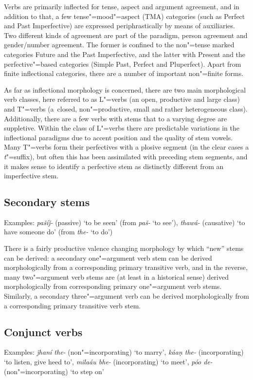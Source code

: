 Verbs are primarily inflected for tense, aspect and argument agreement, and in addition to that, a few tense"=mood"=aspect (TMA) categories (such as Perfect and Past Imperfective) are expressed periphrastically by means of auxiliaries. Two different kinds of agreement are part of the paradigm, person agreement and gender/number agreement. The former is confined to the non"=tense marked categories Future and the Past Imperfective, and the latter with Present and the perfective"=based categories (Simple Past, Perfect and Pluperfect). Apart from finite inflectional categories, there are a number of important non"=finite forms.


As far as inflectional morphology is concerned, there are two main morphological verb classes, here referred to as L"=verbs (an open, productive and large class) and T"=verbs (a~closed, non"=productive, small and rather heterogeneous class). Additionally, there are a few verbs with stems that to a varying degree are suppletive. Within the class of L"=verbs there are predictable variations in the inflectional paradigms due to accent position and the quality of stem vowels. Many T"=verbs form their perfectives with a plosive segment (in the clear cases a \textit{t}"=suffix), but often this has been assimilated with preceding stem segments, and it makes sense to identify a perfective stem as distinctly different from an imperfective stem.


\subsection{Secondary stems}
\label{subsec:3b-3-1}
Examples: \textit{pašíǰ-} (passive) `to be seen' (from \textit{paš-} `to see'), \textit{thawá-} (causative) `to have someone do' (from \textit{the-} `to do')


There is a fairly productive valence changing morphology by which “new” stems can be derived: a secondary one"=argument verb stem can be derived morphologically from a corresponding primary transitive verb, and in the reverse, many two"=argument verb stems are (at least in a historical sense) derived morphologically from corresponding primary one"=argument verb stems. Similarly, a secondary three"=argument verb can be derived morphologically from a corresponding primary transitive verb stem. 


\subsection{Conjunct verbs}
\label{subsec:3b-3-2}
Examples: \textit{ǰhaní the-} (non"=incorporating) `to marry', \textit{káaṇ the-} (incorporating) `to listen, give heed to', \textit{milaáu bhe-} (incorporating) `to meet', \textit{póo de-} (non"=incorporating) `to step on'


